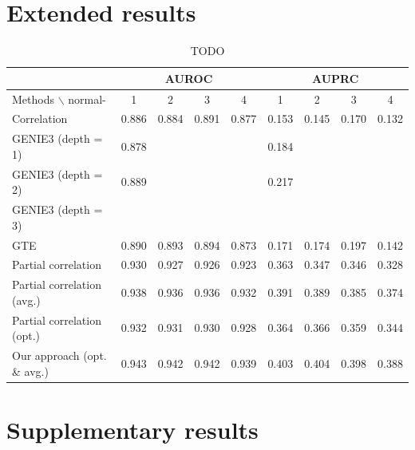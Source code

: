 \documentclass[wcp]{jmlr}
\begin{document}


\section{Extended results}

\begin{table}
\small
\centering
\begin{tabular}{@{}l *{8}{c}@{}}
  & \multicolumn{4}{c}{AUROC} & \multicolumn{4}{c}{AUPRC} \\
\hline \hline
Methods $\backslash$ normal- & 1 & 2 & 3 & 4 & 1 & 2 & 3 & 4 \\
\hline \hline
Correlation            & 0.886 & 0.884 & 0.891 & 0.877 & 0.153 & 0.145 & 0.170 & 0.132 \\
GENIE3 (depth = 1)     & 0.878 & & & & 0.184 & & & \\
GENIE3 (depth = 2)     & 0.889 & & & & 0.217 & & & \\
GENIE3 (depth = 3)     & & & & & & & & \\
GTE                    & 0.890 & 0.893 & 0.894 & 0.873 & 0.171 & 0.174 & 0.197 & 0.142 \\
Partial correlation    & 0.930 &  0.927 &  0.926 &  0.923& 0.363  & 0.347 &  0.346 & 0.328 \\
Partial correlation (avg.) & 0.938 & 0.936 & 0.936 & 0.932& 0.391 & 0.389 & 0.385 & 0.374\\
Partial correlation (opt.) & 0.932 & 0.931 & 0.930 & 0.928 & 0.364 & 0.366 & 0.359 & 0.344 \\
Our approach (opt. \& avg.)    & 0.943 & 0.942 & 0.942 & 0.939 & 0.403 & 0.404 & 0.398 & 0.388 \\
\end{tabular}
\caption{TODO}
\label{tab:tab1}
\end{table}


\section{Supplementary results}
\end{document}
